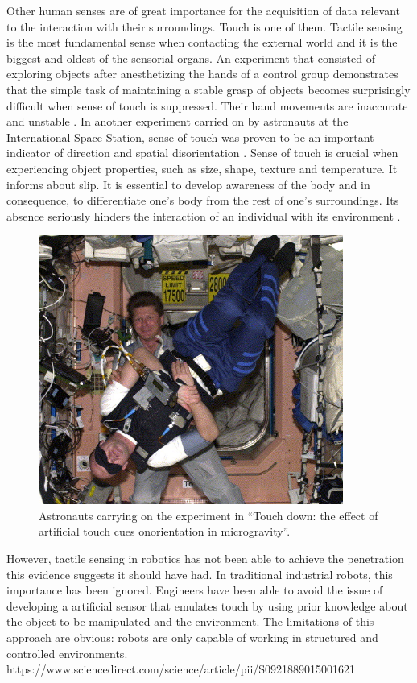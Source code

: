 Other human senses are of great importance for the acquisition of data relevant to the interaction with their surroundings. Touch is one of them. Tactile sensing is the most fundamental sense when contacting the external world and it is the biggest and oldest of the sensorial organs. An experiment that consisted of exploring objects after anesthetizing the hands of a control group demonstrates that the simple task of maintaining a stable grasp of objects becomes surprisingly difficult when sense of touch is suppressed. Their hand movements are inaccurate and unstable \cite{westling1984factors}. In another experiment carried on by astronauts at the International Space Station, sense of touch was proven to be an important indicator of direction and spatial disorientation \cite{van2006touch}. Sense of touch is crucial when experiencing object properties, such as size, shape, texture and temperature. It informs about slip. It is essential to develop awareness of the body and in consequence, to differentiate one’s body from the rest of one’s surroundings. Its absence seriously hinders the interaction of an individual with its environment \cite{dahiya2009tactile}.

\begin{figure}[htbp]
    \caption[Astronauts]{
    Astronauts carrying on the experiment in ``Touch down:  the effect of artificial touch cues onorientation in microgravity''. \cite{van2006touch}
    }
    \begin{center}
    \includegraphics[width=100mm]{figs/astronauts.jpg}
    \end{center}
    \label{fig:astronauts}
\end{figure}

However, tactile sensing in robotics has not been able to achieve the penetration this evidence suggests it should have had. In traditional industrial robots, this importance has been ignored. Engineers have been able to avoid the issue of developing a artificial sensor that emulates touch by using prior knowledge about the object to be manipulated and the environment. The limitations of this approach are obvious: robots are only capable of working in structured and controlled environments. https://www.sciencedirect.com/science/article/pii/S0921889015001621

